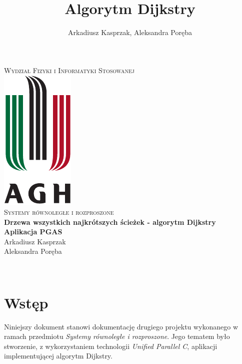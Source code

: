 \documentclass[12pt]{article}
\title{Algorytm Dijkstry}
\author{Arkadiusz Kasprzak, Aleksandra Poręba}
\makeatletter
\let\thetitle\@title
\let\theauthor\@author
\makeatother
\begin{document}
\begin{center}
\textsc{\normalsize Wydział Fizyki i Informatyki Stosowanej}\\[2.0cm] 
\includegraphics[scale = 1]{logo.pdf}\\[1cm] 
\textsc{\Large Systemy równoległe i rozproszone}\\[0.4cm] 


{ \huge \bfseries \LARGE{Drzewa wszystkich najkrótszych ścieżek - algorytm Dijkstry} }\\[0.2cm] 
{ \huge \bfseries \LARGE{Aplikacja PGAS} }\\[1cm] 

\flushright \Large Arkadiusz Kasprzak \\ Aleksandra Poręba

\vfill 

\center {\today}\\[2cm] 


\pagebreak 

\end{center}

\setcounter{tocdepth}{2}
\tableofcontents
\pagebreak


\pagestyle{fancy}
\fancyhf{}

\rhead{\theauthor}
\lhead{\thetitle}
\cfoot{\thepage}

\section{Wstęp}
Niniejszy dokument stanowi dokumentację drugiego projektu wykonanego w ramach przedmiotu \textit{Systemy równoległe i rozproszone}. Jego tematem było stworzenie, z wykorzystaniem technologii \textit{Unified Parallel C}, aplikacji implementującej algorytm Dijkstry.
\end{document}
